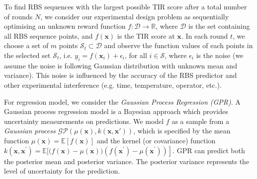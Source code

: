 To find RBS sequences with the largest possible TIR score after a total number of rounds $N$,  we consider our experimental design problem as sequentially optimising an unknown reward function $f: \mathcal{D} \rightarrow \mathbb{R}$, where $\mathcal{D}$ is the set containing all RBS sequence points, and $f(\mathbf{x})$ is the TIR score at $\mathbf{x}$. 
In each round $t$, we choose a set of $m$ points $\mathcal{S}_t \subset \mathcal{D}$ and observe the function values of each points in the selected set $\mathcal{S}_t$, i.e. $y_i = f(\mathbf{x}_i) + \epsilon_i$, for all $i \in \mathcal{S}$, where $\epsilon_i$ is the noise (we assume the noise is following Gaussian distribution with unknown mean and variance). This noise is influenced by the accuracy of the RBS predictor and other experimental interference (e.g. time, temperature, operator, etc.). 

For regression model, we consider the \textit{Gaussian Process Regression (GPR)}.
A Gaussian process regression model \cite{Rasmussen2004} is a Bayesian approach which provides uncertainty measurements on predictions. 
We model $f$ as a sample from a \textit{Gaussian process} $\mathcal{G} \mathcal{P}(\mu(\mathbf{x}), k(\mathbf{x}, \mathbf{x'}))$, which is specified by the mean function $\mu(\mathbf{x})=\mathbb{E}[f(\mathbf{x})]$ and the kernel (or covariance) function $k\left(\mathbf{x}, \mathbf{x}^{\prime}\right)=\mathbb{E}[(f(\mathbf{x})-\left.\mu(\mathbf{x}))\left(f\left(\mathbf{x}^{\prime}\right)-\mu\left(\mathbf{x}^{\prime}\right)\right)\right]$.
GPR can predict both the posterior mean and posterior variance. The posterior variance represents the level of uncertainty for the prediction. 


